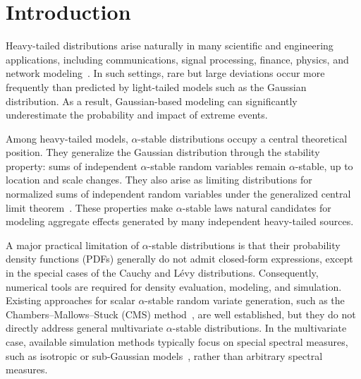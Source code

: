 \section{Introduction}

Heavy-tailed distributions arise naturally in many scientific and engineering applications, including communications, signal processing, finance, physics, and network modeling~\citep{marcel2008,Tsih1995,crovella1998heavy,nolancirc2013,taleb2022statisticalconsequencesfattails}. In such settings, rare but large deviations occur more frequently than predicted by light-tailed models such as the Gaussian distribution. As a result, Gaussian-based modeling can significantly underestimate the probability and impact of extreme events.

Among heavy-tailed models, $\alpha$-stable distributions occupy a central theoretical position. They generalize the Gaussian distribution through the stability property: sums of independent $\alpha$-stable random variables remain $\alpha$-stable, up to location and scale changes. They also arise as limiting distributions for normalized sums of independent random variables under the generalized central limit theorem~\citep{kolmo1968}. These properties make $\alpha$-stable laws natural candidates for modeling aggregate effects generated by many independent heavy-tailed sources.

A major practical limitation of $\alpha$-stable distributions is that their probability density functions (PDFs) generally do not admit closed-form expressions, except in the special cases of the Cauchy and Lévy distributions. Consequently, numerical tools are required for density evaluation, modeling, and simulation. Existing approaches for scalar $\alpha$-stable random variate generation, such as the Chambers--Mallows--Stuck (CMS) method~\citep{ChambersJ.M.1976AMfS}, are well established, but they do not directly address general multivariate $\alpha$-stable distributions. In the multivariate case, available simulation methods typically focus on special spectral measures, such as isotropic or sub-Gaussian models~\citep{nolancirc2013}, rather than arbitrary spectral measures.

